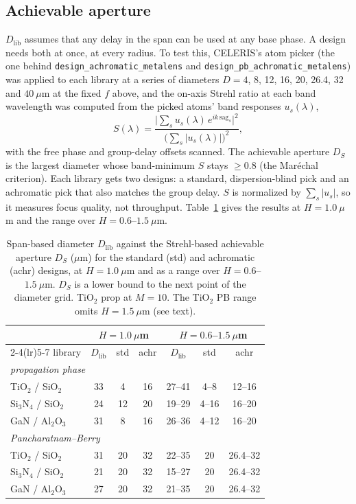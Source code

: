 \documentclass[preprint,12pt]{elsarticle}
\begin{document}
\subsection{Achievable aperture}
$D_\mathrm{lib}$ assumes that any delay in the span can be used at any base phase. A
design needs both at once, at every radius. To test this, CELERIS's atom picker (the
one behind \texttt{design\_\allowbreak achromatic\_\allowbreak metalens} and
\texttt{design\_\allowbreak pb\_\allowbreak achromatic\_\allowbreak metalens}) was applied to each library at a series of
diameters $D=4$, 8, 12, 16, 20, 26.4, 32 and $40~\mu$m at the fixed $f$ above,
and the on-axis Strehl ratio at each band wavelength was computed from the picked atoms'
band responses $u_s(\lambda)$,
\begin{equation}
S(\lambda) = \frac{\bigl|\sum_s u_s(\lambda)\,e^{ik\,\mathrm{sag}_s}\bigr|^2}
                  {\bigl(\sum_s |u_s(\lambda)|\bigr)^2},
\end{equation}
with the free phase and group-delay offsets scanned. The achievable aperture $D_S$ is the
largest diameter whose band-minimum $S$ stays $\ge0.8$ (the Mar\'echal criterion). Each
library gets two designs: a standard, dispersion-blind pick and an achromatic pick that
also matches the group delay. $S$ is normalized by $\sum_s|u_s|$, so it measures focus
quality, not throughput. Table~\ref{tab:r1ds} gives the results at $H=1.0~\mu$m and the
range over $H=0.6$--$1.5~\mu$m.

\begin{table}[t]
\centering
\caption{Span-based diameter $D_\mathrm{lib}$ against the Strehl-based achievable
aperture $D_S$ ($\mu$m) for the standard (std) and achromatic (achr) designs, at
$H=1.0~\mu$m and as a range over $H=0.6$--$1.5~\mu$m. $D_S$ is a lower bound to the next
point of the diameter grid. TiO$_2$ prop at $M=10$. The TiO$_2$ PB range omits
$H=1.5~\mu$m (see text).}
\label{tab:r1ds}
\small
\setlength{\tabcolsep}{5pt}
\begin{tabular}{l ccc ccc}
\toprule
 & \multicolumn{3}{c}{$H=1.0~\mu$m} & \multicolumn{3}{c}{$H=0.6$--$1.5~\mu$m} \\
\cmidrule(lr){2-4}\cmidrule(lr){5-7}
library & $D_\mathrm{lib}$ & std & achr & $D_\mathrm{lib}$ & std & achr \\
\midrule
\multicolumn{7}{l}{\emph{propagation phase}} \\
TiO$_2$ / SiO$_2$       & 33 & 4  & 16 & 27--41 & 4--8   & 12--16 \\
Si$_3$N$_4$ / SiO$_2$   & 24 & 12 & 20 & 19--29 & 4--16  & 16--20 \\
GaN / Al$_2$O$_3$       & 31 & 8  & 16 & 26--36 & 4--12  & 16--20 \\
\multicolumn{7}{l}{\emph{Pancharatnam--Berry}} \\
TiO$_2$ / SiO$_2$       & 31 & 20 & 32 & 22--35 & 20     & 26.4--32 \\
Si$_3$N$_4$ / SiO$_2$   & 21 & 20 & 32 & 15--27 & 20     & 26.4--32 \\
GaN / Al$_2$O$_3$       & 27 & 20 & 32 & 21--35 & 20     & 26.4--32 \\
\bottomrule
\end{tabular}
\end{table}
\end{document}
